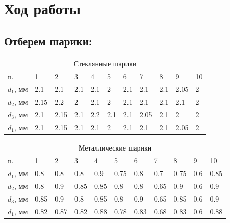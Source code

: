 \documentclass[a4paper,12pt]{article}
\begin{document}
	
	\section{Ход работы}
		\subsection{Отберем шарики:}
		\begin{center}
			\begin{tabular}{  l |  l  l  l  l  l  l  l  l  l  l }
				\multicolumn{11}{c}{Стеклянные шарики} \\ 
				n.        & 1   & 2   & 3   & 4   & 5  & 6   & 7   & 8   & 9    & 10 \\ \hline
				$d_1$, мм & 2.1 & 2.1 & 2.1 & 2.1 & 2  & 2.1 & 2.1 & 2.1 & 2.05 & 2 \\ \hline
				$d_2$, мм & 2.15 & 2.2 & 2 & 2.1 & 2  & 2.1 & 2.1 & 2.1 & 2.1 & 2 \\ \hline
				$d_3$, мм & 2.1 & 2.15 & 2.1 & 2.2 & 2.1  & 2.1 & 2.05 & 2.1 & 2 & 2 \\ \hline
				$d_1$, мм & 2.1 & 2.15 & 2.1 & 2.1 & 2  & 2.1 & 2.1 & 2.1 & 2.05 & 2 \\ \hline
				\hline
			\end{tabular}
		\end{center}
		\begin{center}
			\begin{tabular}{  l |  l  l  l  l  l  l  l  l  l  l }
				\multicolumn{11}{c}{Металлические шарики} \\ 
				n.        & 1   & 2   & 3   & 4   & 5  & 6   & 7   & 8   & 9    & 10 \\ \hline
				$d_1$, мм & 0.8 & 0.8 & 0.8 & 0.9 & 0.75 & 0.8 & 0.7 & 0.75 & 0.6 & 0.85 \\ \hline
				$d_2$, мм & 0.8 & 0.9 & 0.85 & 0.85 & 0.8  & 0.8 & 0.65 & 0.9 & 0.6 & 0.9 \\ \hline
				$d_3$, мм & 0.85 & 0.9 & 0.8 & 0.85 & 0.8  & 0.9 & 0.65 & 0.85 & 0.6 & 0.9 \\ \hline
				$d_1$, мм & 0.82 & 0.87 & 0.82 & 0.88 & 0.78  & 0.83 & 0.68 & 0.83 & 0.6 & 0.88 \\ \hline
				\hline
			\end{tabular}
		\end{center}
\end{document}
